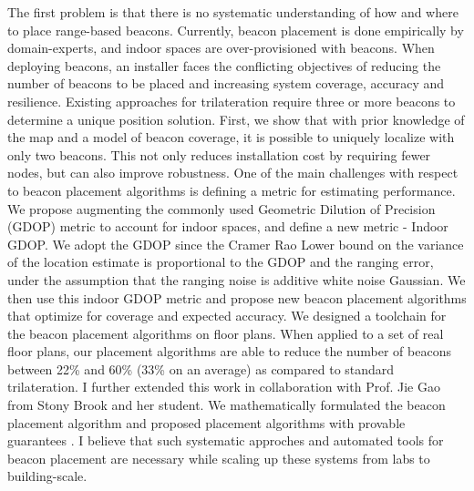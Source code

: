 \documentclass[10pt]{article}
\begin{document}
The first problem is that there is no systematic understanding of how and where to place range-based beacons. Currently, beacon placement is done empirically by domain-experts, and indoor spaces are over-provisioned with beacons. When deploying beacons, an installer faces the conflicting objectives of reducing the number of beacons to be placed and increasing system coverage, accuracy and resilience. Existing approaches for trilateration require three or more beacons to determine a unique position solution. First, we show that with prior knowledge of the map and a model of beacon coverage, it is possible to uniquely localize with only two beacons. This not only reduces installation cost by requiring fewer nodes, but can also improve robustness. One of the main challenges with respect to beacon placement algorithms is defining a metric for estimating performance. We propose augmenting the commonly used Geometric Dilution of Precision (GDOP) metric to account for indoor spaces, and define a new metric - Indoor GDOP. We adopt the GDOP since the Cramer Rao Lower bound on the variance of the location estimate is proportional to the GDOP and the ranging error, under the assumption that the ranging noise is additive white noise Gaussian. We then use this indoor GDOP metric and propose new beacon placement algorithms that optimize for  coverage and expected accuracy. We designed a toolchain for the beacon placement algorithms on floor plans. When applied to a set of real floor plans, our placement algorithms are able to reduce the number of beacons between 22\% and 60\% (33\% on an average) as compared to standard trilateration. I further extended this work in collaboration with Prof. Jie Gao from Stony Brook and her student. We mathematically formulated the beacon placement algorithm and proposed placement algorithms with provable guarantees \cite{beaconplacementtheory}. I believe that such systematic approches and automated tools for beacon placement are necessary while scaling up these systems from labs to building-scale. \\
\end{document}
